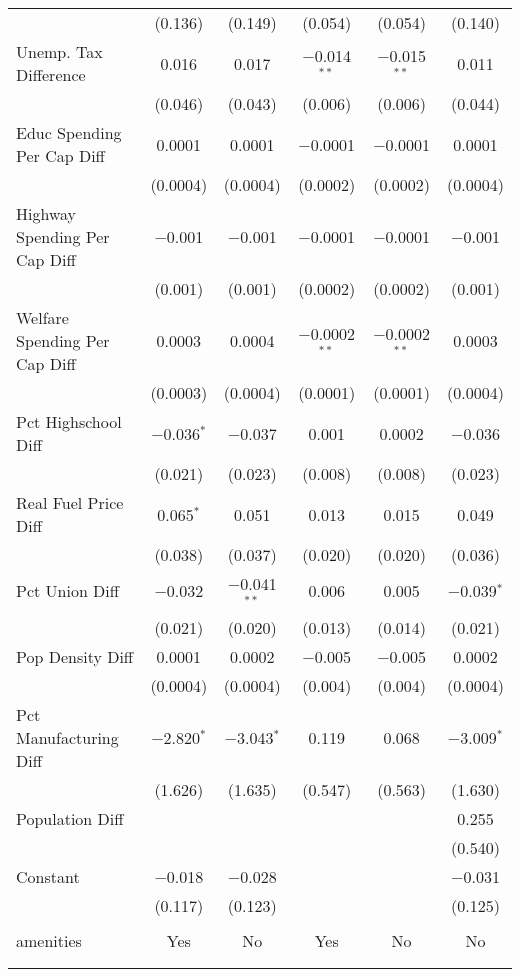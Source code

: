 \begin{table}[!htbp]
\begin{tabular}{@{\extracolsep{5pt}}lccccc}
  & (0.136) & (0.149) & (0.054) & (0.054) & (0.140) \\ 
  Unemp. Tax Difference & 0.016 & 0.017 & $-$0.014$^{**}$ & $-$0.015$^{**}$ & 0.011 \\ 
  & (0.046) & (0.043) & (0.006) & (0.006) & (0.044) \\ 
  Educ Spending Per Cap Diff & 0.0001 & 0.0001 & $-$0.0001 & $-$0.0001 & 0.0001 \\ 
  & (0.0004) & (0.0004) & (0.0002) & (0.0002) & (0.0004) \\ 
  Highway Spending Per Cap Diff & $-$0.001 & $-$0.001 & $-$0.0001 & $-$0.0001 & $-$0.001 \\ 
  & (0.001) & (0.001) & (0.0002) & (0.0002) & (0.001) \\ 
  Welfare Spending Per Cap Diff & 0.0003 & 0.0004 & $-$0.0002$^{**}$ & $-$0.0002$^{**}$ & 0.0003 \\ 
  & (0.0003) & (0.0004) & (0.0001) & (0.0001) & (0.0004) \\ 
  Pct Highschool Diff & $-$0.036$^{*}$ & $-$0.037 & 0.001 & 0.0002 & $-$0.036 \\ 
  & (0.021) & (0.023) & (0.008) & (0.008) & (0.023) \\ 
  Real Fuel Price Diff & 0.065$^{*}$ & 0.051 & 0.013 & 0.015 & 0.049 \\ 
  & (0.038) & (0.037) & (0.020) & (0.020) & (0.036) \\ 
  Pct Union Diff & $-$0.032 & $-$0.041$^{**}$ & 0.006 & 0.005 & $-$0.039$^{*}$ \\ 
  & (0.021) & (0.020) & (0.013) & (0.014) & (0.021) \\ 
  Pop Density Diff & 0.0001 & 0.0002 & $-$0.005 & $-$0.005 & 0.0002 \\ 
  & (0.0004) & (0.0004) & (0.004) & (0.004) & (0.0004) \\ 
  Pct Manufacturing Diff & $-$2.820$^{*}$ & $-$3.043$^{*}$ & 0.119 & 0.068 & $-$3.009$^{*}$ \\ 
  & (1.626) & (1.635) & (0.547) & (0.563) & (1.630) \\ 
  Population Diff &  &  &  &  & 0.255 \\ 
  &  &  &  &  & (0.540) \\ 
  Constant & $-$0.018 & $-$0.028 &  &  & $-$0.031 \\ 
  & (0.117) & (0.123) &  &  & (0.125) \\ 
 \hline \\[-1.8ex] 
amenities & Yes & No & Yes & No & No \\ 
\hline \\[-1.8ex] 
\hline 
\hline \\[-1.8ex] 
\end{tabular} 
\end{table} 
